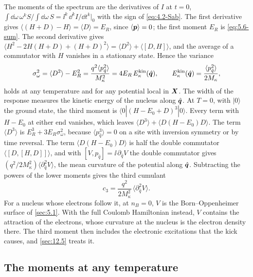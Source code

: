 The moments of the spectrum are the derivatives of $I$ at $t = 0$, $\int\dd\omega\,\omega^kS/\int\dd\omega\,S = \ii^k\,\dd^kI/\dd t^k|_0$ with the sign of \cref{eq:4.2-Sab}. The first derivative gives $\langle(H + D) - H\rangle = \langle D\rangle = E_R$, since $\langle\bm{p}\rangle = 0$; the first moment $E_R$ is \cref{eq:5.6-sum}. The second derivative gives $\langle H^2 - 2H(H + D) + (H + D)^2\rangle = \langle D^2\rangle + \langle[D, H]\rangle$, and the average of a commutator with $H$ vanishes in a stationary state. Hence the variance
\begin{equation}
  \sigma_\omega^2 = \langle D^2\rangle - E_R^2 = \frac{q^2\langle p_{\hat q}^2\rangle}{M_\kappa^2} = 4E_R\,E^{\mathrm{kin}}_\kappa(\hat{\bm{q}}) , \qquad E^{\mathrm{kin}}_\kappa(\hat{\bm{q}}) = \frac{\langle p_{\hat q}^2\rangle}{2M_\kappa} ,
  \label{eq:D.32-var}
\end{equation}
holds at any temperature and for any potential local in $\bm{X}$. The width of the response measures the kinetic energy of the nucleus along $\hat{\bm{q}}$. At $T = 0$, with $|0\rangle$ the ground state, the third moment is $\langle0|(H - E_0 + D)^3|0\rangle$. Every term with $H - E_0$ at either end vanishes, which leaves $\langle D^3\rangle + \langle D(H - E_0)D\rangle$. The term $\langle D^3\rangle$ is $E_R^3 + 3E_R\sigma_\omega^2$, because $\langle p_{\hat q}^3\rangle = 0$ on a site with inversion symmetry or by time reversal. The term $\langle D(H - E_0)D\rangle$ is half the double commutator $\langle[D,[H, D]]\rangle$, and with $[V, p_{\hat q}] = \ii\,\partial_{\hat q}V$ the double commutator gives $(q^2/2M_\kappa^2)\langle\partial_{\hat q}^2V\rangle$, the mean curvature of the potential along $\hat{\bm{q}}$. Subtracting the powers of the lower moments gives the third cumulant
\begin{equation}
  c_3 = \frac{q^2}{2M_\kappa^2}\,\bigl\langle\partial_{\hat q}^2V\bigr\rangle .
  \label{eq:D.32-c3}
\end{equation}
For a nucleus whose electrons follow it, at $n_B = 0$, $V$ is the Born--Oppenheimer surface of \cref{sec:5.1}. With the full Coulomb Hamiltonian instead, $V$ contains the attraction of the electrons, whose curvature at the nucleus is the electron density there. The third moment then includes the electronic excitations that the kick causes, and \cref{sec:12.5} treats it.

\subsection{The moments at any temperature}

